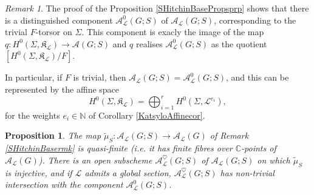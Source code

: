 \documentclass{amsart}
\newtheorem{proposition}[theorem]{Proposition}
\theoremstyle{remark}
\newtheorem{remark}[theorem]{Remark}
\numberwithin{theorem}{section}
\numberwithin{equation}{section}
\begin{document}
\begin{remark}\label{SHitchinBasePropsrmk}
    The proof of the Proposition \ref{SHitchinBasePropsprp} shows that there is a distinguished component $\mathcal A^0_{\mathcal L}(G;S)$ of $\mathcal A_\mathcal L(G;S)$, corresponding to the trivial $F$-torsor on $\Sigma$. This component is exacly the image of the map $q:H^0(\Sigma,\mathfrak{K}_\mathcal L) \rightarrow \mathcal A(G;S)$ and $q$ realises $\mathcal A^0_{\mathcal L}(G;S)$ as the quotient $[H^0(\Sigma,\mathfrak{K}_\mathcal L)/F]$.
    
    In particular, if $F$ is trivial, then $\mathcal A_{\mathcal L}(G;S) = \mathcal A_{\mathcal L}^0(G;S)$, and this can be represented by the affine space
    \begin{equation}\label{SHitchinBasePropseqn}
        H^0(\Sigma,\mathfrak{K}_\mathcal L) = \bigoplus_{i=1}^rH^0(\Sigma,\mathcal L^{e_i}),
    \end{equation}
    for the weights $e_i \in \mathbb{N}$ of Corollary \ref{KatsyloAffinecor}.
\end{remark}

\begin{proposition}\label{SHitchinBaseNormprp}
    The map $\tilde{\mu}_S:\mathcal A_{\mathcal L}(G;S) \rightarrow \mathcal A_\mathcal L(G)$ of Remark \ref{SHitchinBasermk} is quasi-finite (i.e. it has finite fibres over $\mathbb{C}$-points of $\mathcal A_{\mathcal L}(G)$). There is an open subscheme $\mathcal A_{\mathcal L}^\heartsuit(G;S)$ of $\mathcal A_{\mathcal L}(G;S)$ on which $\tilde{\mu}_S$ is injective, and if $\mathcal L$ admits a global section, $\mathcal A^\heartsuit_{\mathcal L}(G;S)$ has non-trivial intersection with the component $\mathcal A_\mathcal L^0(G;S)$.
\end{proposition}
\end{document}
